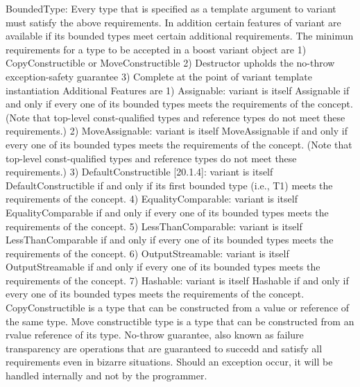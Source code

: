 \documentclass[letterpaper, 12pt]{article}
\begin{document}
	BoundedType:
	Every type that is specified as a template argument to variant must satisfy the above requirements. In addition certain 
	features of variant are available if its bounded types meet certain additional requirements. The minimun requirements for
	a type to be accepted in a boost variant object are
	1) CopyConstructible or MoveConstructible
	2) Destructor upholds the no-throw exception-safety guarantee
	3) Complete at the point of variant template instantiation
	Additional Features are
	1) Assignable: variant is itself Assignable if and only if every one of its bounded types meets the requirements of the concept. 		(Note that top-level const-qualified types and reference types do not meet these requirements.)
	2) MoveAssignable: variant is itself MoveAssignable if and only if every one of its bounded types meets the requirements of 			the concept. (Note that top-level const-qualified types and reference types do not meet these requirements.)
	3) DefaultConstructible [20.1.4]: variant is itself DefaultConstructible if and only if its first bounded type (i.e., T1) meets the 			requirements of the concept.
	4) EqualityComparable: variant is itself EqualityComparable if and only if every one of its bounded types meets the 				requirements of the concept.
	5) LessThanComparable: variant is itself LessThanComparable if and only if every one of its bounded types meets the 				requirements of the concept.
	6) OutputStreamable: variant is itself OutputStreamable if and only if every one of its bounded types meets the requirements 			of the concept.
	7) Hashable: variant is itself Hashable if and only if every one of its bounded types meets the requirements of the concept.
	CopyConstructible is a type that can be constructed from a value or reference of the same type. Move constructible type is a 			type that can be constructed from an rvalue reference of its type.
	No-throw guarantee, also known as failure transparency are operations that are guaranteed to succedd and satisfy all 				requirements even in bizarre situations. Should an exception
	occur, it will be handled internally and not by the programmer. 
	
\end{document}
